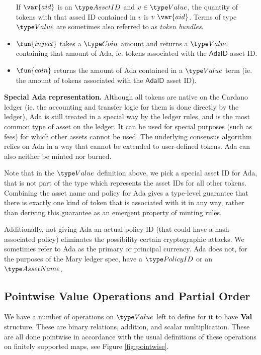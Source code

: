\begin{itemize}
    If $\var{aid}$ is an $\AssetID$ and $v \in \Value$,
    the quantity of tokens with that assed ID contained in $v$ is $v~\var{aid}$.
    Terms of type $\Value$ are sometimes also referred to as
    \emph{token bundles}.

  \item $\fun{inject}$ takes a $\Coin$ amount and returns a $\Value$ containing
  that amount of Ada, ie. tokens associated with the $\mathsf{AdaID}$ asset ID.

  \item $\fun{coin}$ returns the amount of Ada contained in a $\Value$ term (ie.
  the amount of tokens associated with the $\mathsf{AdaID}$ asset ID).
\end{itemize}

\noindent \textbf{Special Ada representation.}
Although all tokens are native on the Cardano ledger (ie. the accounting and
transfer logic for them is done directly by the ledger), Ada is still treated in a
special way by the ledger rules, and is the most common type of asset on the ledger.
It can
be used for special purposes (such as fees) for which other assets cannot be used.
The underlying consensus algorithm relies on Ada in a way that
cannot be extended to user-defined tokens.
Ada can also neither be minted nor burned.

Note that in the $\Value$ definition above, we pick a special asset ID for Ada, that
is not part of the type which represents the asset IDs for all other tokens.
Combining the asset name and policy for Ada gives a type-level guarantee that there is exactly
one kind of token that is associated with it in any way, rather than
deriving this guarantee as an emergent property of minting rules.

Additionally, not giving Ada an actual policy ID
(that could have a hash-associated policy) eliminates the possibility
certain cryptographic attacks.
We sometimes refer to Ada as the primary or principal currency. Ada does not,
for the purposes of the Mary ledger spec, have a $\PolicyID$ or an $\AssetName$.

\subsection{Pointwise Value Operations and Partial Order}

We have a number of operations on $\Value$ left to define for it to have
$\mathbf{Val}$ structure. These are binary relations, addition, and
scalar multiplication. These are all done
pointwise in accordance with the usual definitions of these operations on
finitely supported maps, see Figure \ref{fig:pointwise}.

